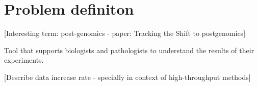 \chapter{Problem definiton}

[Interesting term: post-genomics - paper: Tracking the Shift to postgenomics]

Tool that supports biologists and pathologists to understand the results of their experiments.


[Describe data increase rate - specially in context of high-throughput methods]
